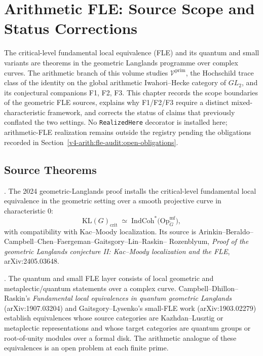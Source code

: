 \chapter{Arithmetic FLE: Source Scope and Status Corrections}
\label{v4-arith:fle-audit}

The critical-level fundamental local equivalence (FLE) and its quantum
and small variants are theorems in the geometric Langlands programme
over complex curves. The arithmetic branch of this volume studies
\(\mathcal{V}^{\mathrm{prim}}\), the Hochschild trace class of the
identity on the global arithmetic Iwahori--Hecke category of
\(GL_{2}\), and its conjectural companions F1, F2, F3. This chapter
records the scope boundaries of the geometric FLE sources, explains
why F1/F2/F3 require a distinct mixed-characteristic framework, and
corrects the status of claims that previously conflated the two
settings. No \texttt{RealizedHere} decorator is installed here;
arithmetic-FLE realization remains outside the registry pending the
obligations recorded in Section~\ref{v4-arith:fle-audit:open-obligations}.

\section{Source Theorems}
\label{v4-arith:fle-audit:sources}

\begin{theorem}
\label{v4-arith:fle-audit:thm:critical-FLE-source}
\ClaimStatusProvedElsewhere. The 2024 geometric-Langlands proof
installs the critical-level fundamental local equivalence in the
geometric setting over a smooth projective curve in characteristic
\(0\):
\[
\mathrm{KL}(G)_{\mathrm{crit}}\;\simeq\;
\mathrm{IndCoh}^{*}\bigl(\mathrm{Op}^{\mathrm{mf}}_{\check G}\bigr),
\]
with compatibility with Kac--Moody localization. Its source is
Arinkin--Beraldo--Campbell--Chen--Faergeman--Gaitsgory--Lin--Raskin--
Rozenblyum, \emph{Proof of the geometric Langlands conjecture II:
Kac--Moody localization and the FLE}, arXiv:2405.03648.
\end{theorem}

\begin{theorem}
\label{v4-arith:fle-audit:thm:quantum-FLE-source}
\ClaimStatusProvedElsewhere. The quantum and small FLE layer consists
of local geometric and metaplectic/quantum statements over a complex
curve. Campbell--Dhillon--Raskin's \emph{Fundamental local
equivalences in quantum geometric Langlands} (arXiv:1907.03204) and
Gaitsgory--Lysenko's small-FLE work (arXiv:1903.02279) establish
equivalences whose source categories are Kazhdan--Lusztig or
metaplectic representations and whose target categories are quantum
groups or root-of-unity modules over a formal disk. The arithmetic
analogue of these equivalences is an open problem at each finite prime.
\end{theorem}

